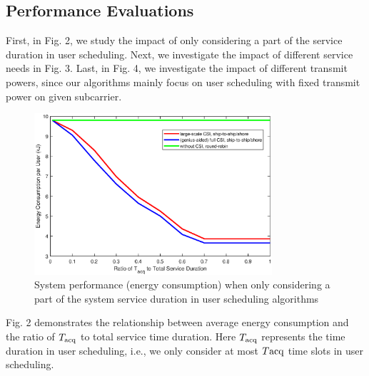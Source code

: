 \documentclass[conference]{IEEEtran}
\begin{document}
 
 \subsection{Performance Evaluations}
 
 First, in Fig. 2, we study the impact of only considering a part of the service duration in user scheduling. 
 Next, we investigate the impact of different service needs in Fig. 3. 
 Last, in Fig. 4, we investigate the impact of different transmit powers, since our algorithms mainly focus on user scheduling with fixed transmit power on given subcarrier. 
 
 
 \begin{figure} [htb]
 \begin{center}
 \includegraphics*[width=8.8cm]{Tranges.eps}
 \end{center}
 \vspace*{-4mm} 
 \caption{System performance (energy consumption) when only considering a part of the system service duration in user scheduling algorithms} \label{fig:2}
 \vspace*{-2mm} 
 \end{figure}
 
 
 Fig. 2 demonstrates the relationship between average energy consumption and the ratio of ${T_{\rm{acq}}}$ to total service time duration. Here ${T_{\rm{acq}}}$ represents the time duration in user scheduling, i.e., we only consider at most $T{\rm{acq}}$ time slots in user scheduling. %
 
\end{document}
